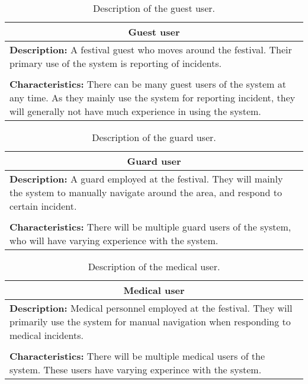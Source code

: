 \begin{table}[htbp]
    \centering
    \begin{tabularx}{/4}{X}
        \toprule
        \multicolumn{1}{c}{\textbf{Guest user}} \\ 
        \midrule
        \textbf{Description:} A festival guest who moves around the festival. Their primary use of the system is reporting of incidents. \\
        \\
        \textbf{Characteristics:} There can be many guest users of the system at any time. As they mainly use the system for reporting incident, they will generally not have much experience in using the system. \\
        \bottomrule
    \end{tabularx}
    \caption{Description of the guest user.}
    \label{tab:guest_user}
\end{table}

\begin{table}[htbp]
    \centering
    \begin{tabularx}{/4}{X}
        \toprule
        \multicolumn{1}{c}{\textbf{Guard user}} \\ 
        \midrule
        \textbf{Description:} A guard employed at the festival. They will mainly the system to manually navigate around the area, and respond to certain incident. \\
        \\
        \textbf{Characteristics:} There will be multiple guard users of the system, who will have varying experience with the system. \\
        \bottomrule
    \end{tabularx}
    \caption{Description of the guard user.}
    \label{tab:guard_user}
\end{table}

\begin{table}[htbp]
    \centering
    \begin{tabularx}{/4}{X}
        \toprule
        \multicolumn{1}{c}{\textbf{Medical user}} \\ 
        \midrule
        \textbf{Description:} Medical personnel employed at the festival. They will primarily use the system for manual navigation when responding to medical incidents. \\
        \\
        \textbf{Characteristics:} There will be multiple medical users of the system. These users have varying experince with the system. \\
        \bottomrule
    \end{tabularx}
    \caption{Description of the medical user.}
    \label{tab:med_user}
\end{table}